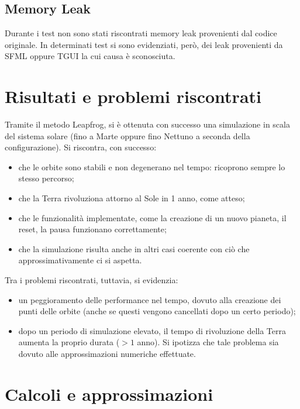 \documentclass{article}
\begin{document}
\subsection{Memory Leak}
Durante i test non sono stati riscontrati memory leak provenienti dal codice originale. In determinati test si sono evidenziati, però, dei leak provenienti da SFML oppure TGUI la cui causa è sconosciuta.

\section{Risultati e problemi riscontrati}
Tramite il metodo Leapfrog, si è ottenuta con successo una simulazione in scala del sistema solare (fino a Marte oppure fino Nettuno a seconda della configurazione). 
Si riscontra, con successo:
\begin{itemize}
    \item che le orbite sono stabili e non degenerano nel tempo: ricoprono sempre lo stesso percorso;
    \item che la Terra rivoluziona attorno al Sole in 1 anno, come atteso;
    \item che le funzionalità implementate, come la creazione di un nuovo pianeta, il reset, la pausa funzionano correttamente;
    \item che la simulazione risulta anche in altri casi coerente con ciò che approssimativamente ci si aspetta.
\end{itemize}

Tra i problemi riscontrati, tuttavia, si evidenzia:
\begin{itemize}
    \item un peggioramento delle performance nel tempo, dovuto alla creazione dei punti delle orbite (anche se questi vengono cancellati dopo un certo periodo);
    \item dopo un periodo di simulazione elevato, il tempo di rivoluzione della Terra aumenta la proprio durata ($> 1$ anno). Si ipotizza che tale problema sia dovuto alle approssimazioni numeriche effettuate.
\end{itemize}

\appendix
\section{Calcoli e approssimazioni}
\end{document}
